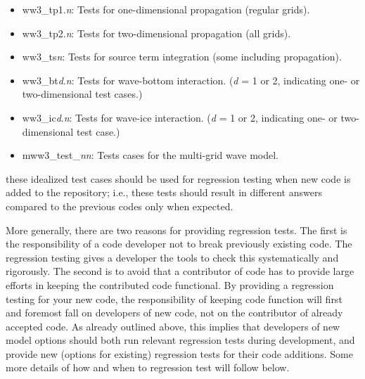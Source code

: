 \documentclass[12pt]{article}
\newcommand{\file}{\sf}
\begin{document}
\begin{itemize}

\item {\file ww3\_tp1.{\it n}}: Tests for one-dimensional propagation (regular
       grids). 

\item {\file ww3\_tp2.{\it n}}: Tests for two-dimensional propagation (all
       grids).

\item {\file ww3\_ts{\it n}}: Tests for source term integration (some
       including propagation).

\item {\file ww3\_bt{\it d}.{\it n}}: Tests for wave-bottom  interaction.
       ({\it d} = 1 or 2, indicating one- or two-dimensional test cases.)

\item {\file ww3\_ic{\it d}.{\it n}}: Tests for wave-ice interaction.
       ({\it d} = 1 or 2, indicating one- or two-dimensional test case.)


\item {\file mww3\_test\_{\it nn}}: Tests cases for the multi-grid wave model.
\end{itemize}

\noindent
these idealized test cases should be used for regression testing when new code
is added to the repository; i.e., these tests should result in different
answers compared to the previous codes only when expected. 

More generally, there are two reasons for providing regression tests. The
first is the responsibility of a code developer not to break previously
existing code. The regression testing gives a developer the tools to check
this systematically and rigorously. The second is to avoid that a contributor
of code has to provide large efforts in keeping the contributed code
functional. By providing a regression testing for your new code, the
responsibility of keeping code function will first and foremost fall on
developers of new code, not on the contributor of already accepted code. As
already outlined above, this implies that developers of new model options
should both run relevant regression tests during development, and provide new
(options for existing) regression tests for their code additions. Some more
details of how and when to regression test will follow below.
\end{document}

